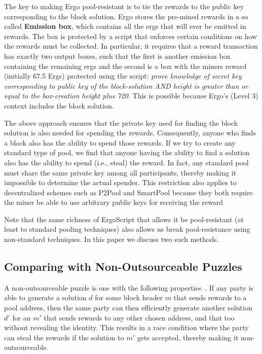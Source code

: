 \documentclass[11pt]{article}
\newcommand{\authnote}[2]{\marginpar{\parbox{\marginparwidth}{\tiny %
  \textsf{#1 {\textcolor{blue}{notes: #2}}}}}%
  \textcolor{blue}{\textbf{\dag}}}
\newcommand{\authnote}[2]{
  \textsf{#1 \textcolor{blue}{: #2}}}
\newcommand{\authnote}[2]{}
\newcommand{\snote}[1]{{\authnote{\textcolor{yellow}{Scalahub notes}}{#1}}}
\newcommand{\langname}{ErgoScript\xspace}
\newcommand{\powname}{Autolykos\xspace}
\begin{document}
The key to making Ergo pool-resistant is to tie the rewards to the public key corresponding to the block solution. 
Ergo stores the pre-mined rewards in a so called \textbf{Emission box}, which contains all the ergs that will ever be emitted in rewards. The box is protected by a script that enforces certain conditions on how the rewards must be collected. In particular, it requires that a reward transaction has exactly two output boxes, such that the first is another emission box containing the remaining ergs and the second is a box with the miners reward (initially 67.5 Ergs) protected using the script: {\em prove knowledge of secret key corresponding to public key of the block-solution AND height is greater than or equal to the box-creation height plus 720}.  
This is possible because Ergo's (Level 3) context includes the block solution.  

The above approach ensures that the private key used for finding the block solution is also needed for spending the rewards. Consequently, anyone who finds a block also has the ability to spend those rewards. 
If we try to create any standard type of pool, we find that anyone having the ability to find a solution also has the ability to spend (i.e., steal) the reward. In fact, any standard pool must share the same private key among all participants, thereby making it impossible to determine the actual spender. This restriction also applies to decentralized schemes such as P2Pool and SmartPool because they both require the miner be able to use arbitrary public keys for receiving the reward

Note that the same richness of \langname that allows it be pool-resistant (at least to standard pooling techniques) also allows us break pool-resistance using non-standard techniques. In this paper we discuss two such methods.  

\snote{Discuss how \powname fits (which) definition of non-outsourceable puzzles.}

\subsection{Comparing with Non-Outsourceable Puzzles}

A non-outsourceable puzzle is one with the following properties~\cite{miller2015nonoutsourceable}. If any party is able to generate a solution $d$ for some block header $m$ that sends rewards to a pool address, then the same party can then efficiently generate another solution $d'$ for an $m'$ that sends rewards to any other chosen address, and that too without revealing the identity. This results in a race condition where the party can steal the rewards if the solution to $m'$ gets accepted, thereby making it non-outsourceable. 
\end{document}
